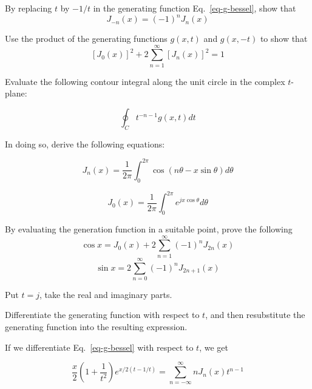 \begin{exer}
By replacing $t$ by $-1/t$ in the generating function Eq.~\ref{eq-g-bessel}, show that
$$J_{-n}(x)=(-1)^nJ _n(x)$$
\end{exer}

\begin{exer}
Use the product of the generating functions $g(x,t)$ and $g(x,-t)$ to show that
$$\left[ J_0(x) \right]^2 + 2 \sum_{n=1}^\infty \left[ J_n(x) \right]^2 = 1 $$
\end{exer}

\pagebreak

\begin{exer}
Evaluate the following contour integral along the unit circle in the complex $t$-plane:

$$ \oint_C t^{-n-1} g(x,t) dt $$

In doing so, derive the following equations:

$$J_n(x) = \frac {1}{2\pi} \int_0 ^ {2 \pi} \cos (n \theta - x \sin \theta ) d\theta $$

$$ J_0(x) =  \frac {1}{2\pi} \int_0 ^ {2 \pi}  e^{j x \cos \theta} d \theta $$
\end{exer}

\begin{exer}
By evaluating the generation function in a suitable point, prove the following
$$ \cos x =  J_0(x) + 2 \sum_{n=1}^\infty (-1)^n J_{2n}(x)  $$
$$ \sin x =  2 \sum_{n=0}^\infty (-1)^n J_{2n+1}(x)  $$
\begin{hnt}
Put $t=j$, take the real and imaginary parts.
\end{hnt}
\end{exer}


\pagebreak



\begin{cue}
Differentiate the generating function with respect to $t$, and then resubstitute the generating function into the resulting expression. 
\end{cue}

If we differentiate Eq.~\ref{eq-g-bessel} with respect to $t$, we get

\begin{equation}
\frac{x}{2}\left({1 + \frac{1}{t^2}}\right) e^{x/2(t-1/t)} = \sum_{n = - \infty}^{\infty} n J_n(x)t^{n-1}
\end{equation}

